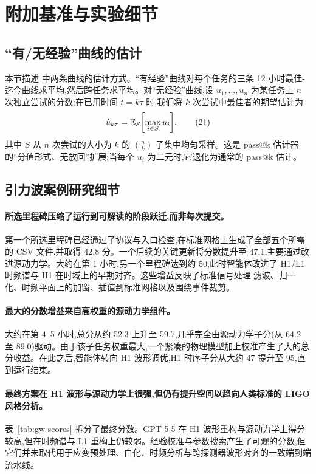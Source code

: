 \section{附加基准与实验细节}
\label{app:extras}

\subsection{``有/无经验''曲线的估计}
\label{app:exp-curves}

本节描述  中两条曲线的估计方式。``有经验''曲线对每个任务的三条 12 小时最佳-迄今曲线求平均,然后跨任务求平均。对``无经验''曲线,设 $u_{1}, \ldots, u_{n}$ 为某任务上 $n$ 次独立尝试的分数;在已用时间 $t = k \tau$ 时,我们将 $k$ 次尝试中最佳者的期望估计为
\[
    \hat{u}_{k \tau} = \mathbb{E}_{S} \biggl[ \max_{i \in S} u_{i} \biggr], \tag{21}
\]
其中 $S$ 从 $n$ 次尝试的大小为 $k$ 的 $\binom{n}{k}$ 子集中均匀采样。这是 pass@k 估计器~\cite{chen2021humaneval} 的``分值形式、无放回''扩展;当每个 $u_{i}$ 为二元时,它退化为通常的 pass@k 估计。

\subsection{引力波案例研究细节}
\label{app:case-study}

\paragraph{所选里程碑压缩了运行到可解读的阶段跃迁,而非每次提交。} 第一个所选里程碑已经通过了协议与入口检查,在标准网格上生成了全部五个所需的 CSV 文件,并取得 42.8 分。一个后续的关键更新将分数提升至 47.1,主要通过改进源动力学。大约在第 1 小时,另一个里程碑达到约 50,此时智能体改进了 H1/L1 时频谱与 H1 在时域上的早期对齐。这些增益反映了标准信号处理:滤波、归一化、时频平面上的加窗、插值到标准网格以及围绕事件裁剪。

\paragraph{最大的分数增益来自高权重的源动力学组件。} 大约在第 4--5 小时,总分从约 52.3 上升至 59.7,几乎完全由源动力学子分(从 64.2 至 89.0)驱动。由于该子任务权重最大,一个紧凑的物理模型加上校准产生了大的总分收益。在此之后,智能体转向 H1 波形调优,H1 时序子分从大约 47 提升至 95,直到运行结束。

\paragraph{最终方案在 H1 波形与源动力学上很强,但仍有提升空间以趋向人类标准的 LIGO 风格分析。} 表~\ref{tab:gw-scores} 拆分了最终分数。GPT-5.5 在 H1 波形重构与源动力学上得分较高,但在时频谱与 L1 重构上仍较弱。经验校准与参数搜索产生了可观的分数,但它们并未取代用于应变预处理、白化、时频分析与跨探测器波形对齐的一致端到端流水线。


